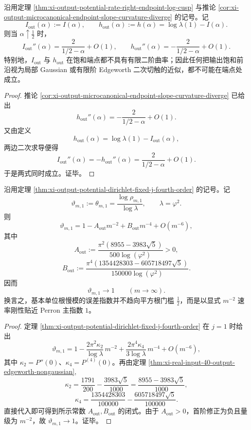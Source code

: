 \begin{corollary}\label{cor:xi-time-part9w-output-frontier-no-finite-gaussian-tangent}
沿用定理 \ref{thm:xi-output-potential-rate-right-endpoint-log-cusp} 与推论 \ref{cor:xi-output-microcanonical-endpoint-slope-curvature-diverge} 的记号。记
\[
I_{\mathrm{out}}(\alpha):=I(\alpha),
\qquad
h_{\mathrm{out}}(\alpha):=h(\alpha)=\log\lambda(1)-I(\alpha).
\]
则当 \(\alpha\uparrow\tfrac12\) 时，
\[
I_{\mathrm{out}}''(\alpha)=\frac{2}{1/2-\alpha}+O(1),
\qquad
h_{\mathrm{out}}''(\alpha)=-\frac{2}{1/2-\alpha}+O(1).
\]
特别地，\(I_{\mathrm{out}}\) 与 \(h_{\mathrm{out}}\) 在饱和端点都不具有有限二阶曲率；因此任何把输出饱和前沿视为局部 Gaussian 或有限阶 Edgeworth 二次切触的近似，都不可能在端点处成立。
\end{corollary}
\begin{proof}
推论 \ref{cor:xi-output-microcanonical-endpoint-slope-curvature-diverge} 已给出
\[
h_{\mathrm{out}}''(\alpha)=-\frac{2}{1/2-\alpha}+O(1).
\]
又由定义
\[
h_{\mathrm{out}}(\alpha)=\log\lambda(1)-I_{\mathrm{out}}(\alpha),
\]
两边二次求导便得
\[
I_{\mathrm{out}}''(\alpha)=-h_{\mathrm{out}}''(\alpha)
=\frac{2}{1/2-\alpha}+O(1).
\]
于是两式同时成立。证毕。
\end{proof}

\begin{theorem}\label{thm:xi-time-part9w-basic-root-unity-error-exponent-to-one}
沿用定理 \ref{thm:xi-output-potential-dirichlet-fixed-j-fourth-order} 的记号。记
\[
\vartheta_{m,1}:=\theta_{m,1}
=\frac{\log\rho_{m,1}}{\log\lambda},
\qquad
\lambda=\varphi^2.
\]
则
\[
\vartheta_{m,1}
=
1-A_{\mathrm{out}}m^{-2}
+B_{\mathrm{out}}m^{-4}
+O(m^{-6}),
\]
其中
\[
A_{\mathrm{out}}
:=
\frac{\pi^2(8955-3983\sqrt5)}{500\log(\varphi^2)}
>0,
\]
\[
B_{\mathrm{out}}
:=
\frac{\pi^4(1354428303-605718497\sqrt5)}{150000\log(\varphi^2)}.
\]
因而
\[
\vartheta_{m,1}\longrightarrow 1
\qquad(m\to\infty).
\]
换言之，基本单位根慢模的误差指数并不趋向平方根门槛 \(\tfrac12\)，而是以显式 \(m^{-2}\) 速率刚性贴近 Perron 主指数 \(1\)。
\end{theorem}
\begin{proof}
定理 \ref{thm:xi-output-potential-dirichlet-fixed-j-fourth-order} 在 \(j=1\) 时给出
\[
\vartheta_{m,1}
=
1-\frac{2\pi^2\kappa_2}{\log\lambda}\,m^{-2}
+\frac{2\pi^4\kappa_4}{3\log\lambda}\,m^{-4}
+O(m^{-6}),
\]
其中 \(\kappa_2=P''(0)\)、\(\kappa_4=P^{(4)}(0)\)。再由定理 \ref{thm:xi-real-input-40-output-edgeworth-nongaussian},
\[
\kappa_2=\frac{1791}{200}-\frac{3983\sqrt5}{1000}
=\frac{8955-3983\sqrt5}{1000},
\]
\[
\kappa_4=\frac{1354428303}{100000}-\frac{605718497\sqrt5}{100000}.
\]
直接代入即可得到所示常数 \(A_{\mathrm{out}},B_{\mathrm{out}}\) 的闭式。由于 \(A_{\mathrm{out}}>0\)，首阶修正为负且量级为 \(m^{-2}\)，故 \(\vartheta_{m,1}\to1\)。证毕。
\end{proof}

